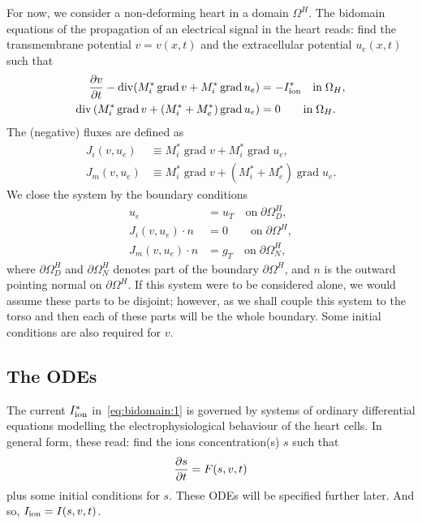 \documentclass[a4paper, reqno]{amsart}
\DeclareMathOperator{\Div}{div}
\DeclareMathOperator{\Grad}{grad}
\newcommand{\ddt}[1]{\frac{\partial #1}{\partial t}}
\numberwithin{equation}{section}
\newcommand{\heart}{\Omega^H}
\begin{document}
For now, we consider a non-deforming heart in a domain $\heart$. The
bidomain equations of the propagation of an electrical signal in the
heart reads: find the transmembrane potential $v = v(x, t)$ and the
extracellular potential $u_e(x, t)$ such that
\begin{align}
  \label{eq:bidomain:1}
  \ddt{v} - \Div (M_i^\ast \Grad v + M_i^{\ast} \Grad u_e) &= - I_{\rm{ion}}^{\ast}
  \quad \text{in} \; \Omega_H, \\
  \Div \left (M_i^{\ast} \Grad v + (M_{i}^{\ast} + M_{e}^{\ast}) \Grad u_e \right )
  &= 0 \quad \quad \text{in} \; \Omega_H.
\end{align}
The (negative) fluxes are defined as
\begin{align}
  J_{i}(v, u_e) &\equiv M_i^\ast \Grad v + M_i^{\ast} \Grad u_e, \\
  J_{m}(v, u_e) &\equiv M_i^{\ast} \Grad v + (M_{i}^{\ast} + M_{e}^{\ast}) \Grad u_e .
\end{align}
We close the system by the boundary conditions
\begin{align}
  \label{eq:heart:bcs:essential}
  u_e &= u_T \quad \text{on} \; \partial \heart_D, \\
  \label{eq:heart:bcs:iflux}
  J_i(v, u_e) \cdot n &= 0 \quad \quad \text{on} \; \partial \heart, \\
  \label{eq:heart:bcs:mflux}
  J_m(v, u_e) \cdot n &= g_T \quad \text{on} \; \partial \heart_N,
\end{align}
where $\partial \heart_D$ and $\partial \heart_N$ denotes part of the
boundary $\partial \heart$, and $n$ is the outward pointing normal on
$\partial \heart$. If this system were to be considered alone, we
would assume these parts to be disjoint; however, as we shall couple
this system to the torso and then each of these parts will be the
whole boundary. Some initial conditions are also required for $v$.

\subsection{The ODEs}

The current $I_{\rm{ion}}^{\ast}$ in~\eqref{eq:bidomain:1} is governed
by systems of ordinary differential equations modelling the
electrophysiological behaviour of the heart cells. In general form,
these read: find the ions concentration(s) $s$ such that
\begin{equation}
  \ddt{s} = F(s, v, t) \quad \\
\end{equation}
plus some initial conditions for $s$. These ODEs will be specified
further later. And so, $I_{\rm{ion}} = I(s, v, t)$.
\end{document}
